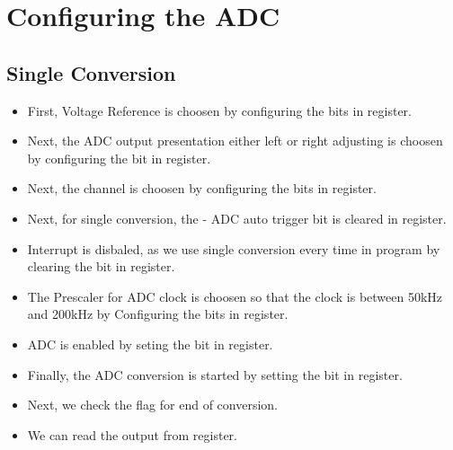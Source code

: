 \documentclass{article}
\begin{document}
\section{Configuring the ADC}
\subsection{Single Conversion}
\begin{itemize}
    \item First, Voltage Reference is choosen by configuring the  bits in  register.
    \item Next, the ADC output presentation either left or right adjusting is choosen by configuring the  bit in  register.
    \item Next, the channel is choosen by configuring the  bits in  register.
    \item Next, for single conversion, the  - ADC auto trigger bit is cleared in  register.
    \item Interrupt is disbaled, as we use single conversion every time in program by clearing the  bit in  register.
    \item The Prescaler for ADC clock is choosen so that the clock is  between 50kHz and 200kHz  by Configuring the  bits in  register.
    \item ADC is enabled by seting the  bit in  register.
    \item Finally, the ADC conversion is started by setting the  bit in   register.
    \item Next, we check the  flag for end of conversion.
    \item We can read the output from  register.
\end{itemize}
\end{document}
